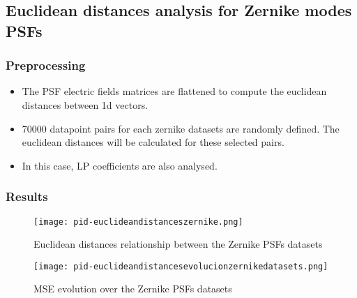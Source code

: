 \subsection{Euclidean distances analysis for Zernike modes PSFs}

	\subsubsection{Preprocessing}
		
		\begin{itemize}
			\item The PSF electric fields matrices are flattened to compute the euclidean distances between 1d vectors.
			\item 70000 datapoint pairs for each zernike datasets are randomly defined. The euclidean distances will be calculated for these selected pairs.
			\item In this case, LP coefficients are also analysed.
		\end{itemize}
			
	\subsubsection{Results}
		\begin{figure*}[ht!]
			\centering
			\texttt{[image: pid-euclideandistanceszernike.png]}
			\caption{Euclidean distances relationship between the Zernike PSFs datasets}
		\end{figure*}
		
		\begin{figure*}[ht!]
			\centering
			\texttt{[image: pid-euclideandistancesevolucionzernikedatasets.png]}
			\caption{MSE evolution over the Zernike PSFs datasets}
		\end{figure*}
		
